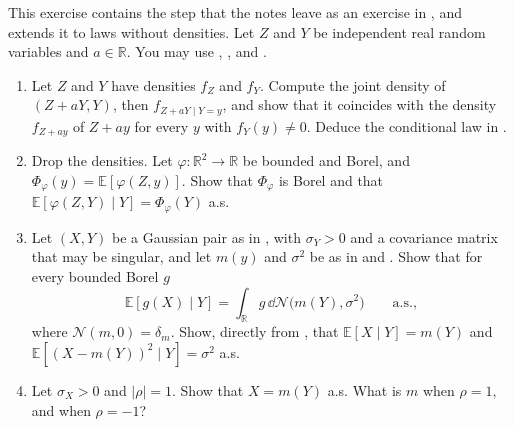 
\begin{exercise}\label{ex:gc-shift}
\medium This exercise contains the step that the notes leave as an exercise in
, and extends it to laws without densities. Let $Z$ and $Y$ be independent
real random variables and $a\in\mathbb R$. You may use ,
,  and .
\begin{enumerate}[label=(\alph*)]
  \item Let $Z$ and $Y$ have densities $f_Z$ and $f_Y$. Compute the joint density of $(Z+aY,Y)$, then
    $f_{Z+aY\mid Y=y}$, and show that it coincides with the density $f_{Z+ay}$ of $Z+ay$ for every $y$
    with $f_Y(y)\ne0$. Deduce the conditional law in .
  \item Drop the densities. Let $\varphi:\mathbb R^2\to\mathbb R$ be bounded and Borel, and
    $\Phi_\varphi(y)=\mathbb E[\varphi(Z,y)]$. Show that $\Phi_\varphi$ is Borel and that
    $\mathbb E[\varphi(Z,Y)\mid Y]=\Phi_\varphi(Y)$ a.s.
  \item Let $(X,Y)$ be a Gaussian pair as in , with $\sigma_Y>0$ and a covariance
    matrix that may be singular, and let $m(y)$ and $\sigma^2$ be as in  and
    . Show that for every bounded Borel $g$
    \[
      \mathbb E[g(X)\mid Y]=\int_{\mathbb R}g\,\dd\mathcal N\big(m(Y),\sigma^2\big)\qquad\text{a.s.},
    \]
    where $\mathcal N(m,0)=\delta_m$. Show, directly from ,
    that $\mathbb E[X\mid Y]=m(Y)$ and $\mathbb E[(X-m(Y))^2\mid Y]=\sigma^2$ a.s.
  \item Let $\sigma_X>0$ and $|\rho|=1$. Show that $X=m(Y)$ a.s. What is $m$ when $\rho=1$, and when
    $\rho=-1$?
\end{enumerate}
\end{exercise}

